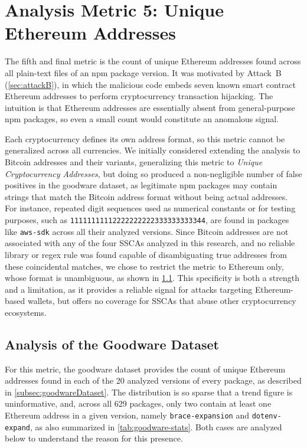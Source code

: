 \section{Analysis Metric 5: Unique Ethereum Addresses}
\label{sec:analysisEthAdd}

The fifth and final metric is the count of unique Ethereum addresses found across all
plain-text files of an \ac{npm} package version.
It was motivated by Attack~B (\cref{sec:attackB}),
in which the malicious code embeds seven known smart contract Ethereum addresses to perform cryptocurrency transaction hijacking.
The intuition is that Ethereum addresses are essentially absent from general-purpose \ac{npm} packages, 
so even a small count would constitute an anomalous signal.

Each cryptocurrency defines its own address format, so this metric cannot be generalized across all currencies.
We initially considered extending the analysis to Bitcoin addresses and their variants,
generalizing this metric to \emph{Unique Cryptocurrency Addresses}, 
but doing so produced a non-negligible number of false positives in the goodware dataset,
as legitimate \ac{npm} packages may contain strings that match the Bitcoin address format without being actual addresses.
For instance, repeated digit sequences used as numerical constants or for testing purposes, 
such as \texttt{11111111112222222222333333333344}, 
are found in packages like \texttt{aws-sdk} across all their analyzed versions.
Since Bitcoin addresses are not associated with any of the four \acp{SSCA} analyzed in this research, 
and no reliable library or regex rule was found capable of disambiguating true addresses from these coincidental matches,
we chose to restrict the metric to Ethereum only, whose format is unambiguous, as shown in \cref{subsec:goodwareEthAdd}.
This specificity is both a strength and a limitation, 
as it provides a reliable signal for attacks targeting Ethereum-based wallets, 
but offers no coverage for \acp{SSCA} that abuse other cryptocurrency ecosystems.

\subsection{Analysis of the Goodware Dataset}
\label{subsec:goodwareEthAdd}

For this metric, the goodware dataset provides the count of unique Ethereum addresses
found in each of the 20 analyzed versions of every package,
as described in \cref{subsec:goodwareDataset}.
The distribution is so sparse that a trend figure is uninformative,  
and, across all 629 packages, only two contain at least one Ethereum address in a given version, 
namely \texttt{brace-expansion} and \texttt{dotenv-expand}, as also summarized in \cref{tab:goodware-stats}.
Both cases are analyzed below to understand the reason for this presence.


